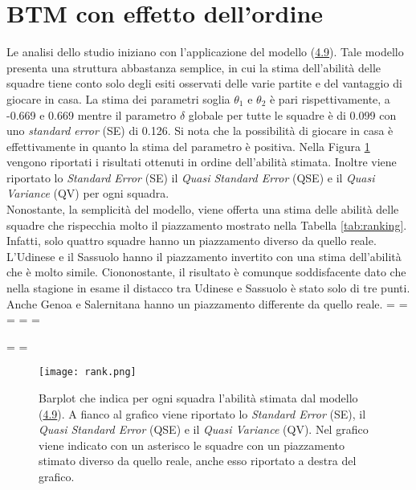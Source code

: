 \section {BTM con effetto dell'ordine}
Le analisi dello studio iniziano con l'applicazione del modello (\hyperref[for:3.9]{4.9}). Tale modello presenta una struttura abbastanza semplice, in cui la stima dell'abilità delle squadre tiene conto solo degli esiti osservati delle varie partite e del vantaggio di giocare in casa. 
La stima dei parametri soglia $\theta_1$ e $\theta_2$ è pari rispettivamente, a -0.669 e 0.669 mentre il parametro $\delta$ globale per tutte le squadre è di 0.099 con uno \emph{standard error} (SE) di 0.126. Si nota che la possibilità di giocare in casa è effettivamente in quanto la stima del parametro è positiva. Nella Figura \ref{tab:BTH} vengono riportati i risultati ottenuti in ordine dell'abilità stimata. Inoltre viene riportato lo \emph{Standard Error} (SE) il \emph{Quasi Standard Error} (QSE) \autocite{firth2004quasi} e il \emph{Quasi Variance} (QV)\autocite{firth2004quasi} per ogni squadra.\\
Nonostante, la semplicità del modello, viene offerta una stima delle abilità delle squadre che rispecchia molto il piazzamento mostrato nella Tabella \ref{tab:ranking}. Infatti, solo quattro squadre hanno un piazzamento diverso da quello reale. L'Udinese e il Sassuolo hanno il piazzamento invertito con una stima dell'abilità che è molto simile. Ciononostante, il risultato è comunque soddisfacente dato che nella stagione in esame il distacco tra Udinese e Sassuolo è stato solo di tre punti. Anche Genoa e Salernitana hanno un piazzamento differente da quello reale.
\newpage
\paperwidth=\pdfpageheight
\paperheight=\pdfpagewidth
\pdfpageheight=\paperheight
\pdfpagewidth=\paperwidth
\headwidth=\textheight

\begingroup 
\vsize=\textwidth
\hsize=\textheight


\pagestyle{empty}
\begin{figure}[htbp]
	\begin{center}
		\texttt{[image: rank.png]}
		\caption{Barplot che indica per ogni squadra l'abilità stimata dal modello (\hyperref[for:3.9]{4.9}). A fianco al grafico viene riportato lo \emph{Standard Error} (SE), il \emph{Quasi Standard Error} (QSE) e il \emph{Quasi Variance} (QV). Nel grafico viene indicato con un asterisco le squadre con un piazzamento stimato diverso da quello reale, anche esso riportato a destra del grafico.} \label{tab:BTH}
	\end{center}
\end{figure}

